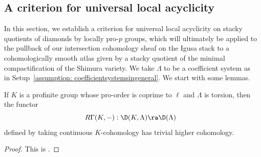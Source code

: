 \documentclass[letterpaper,11pt]{amsart}
\begin{document}
\subsection{A criterion for universal local acyclicity}
In this section, we establish a criterion for universal local acyclicity on stacky quotients of diamonds by locally pro-$p$ groups, which will ultimately be applied to the pullback of our intersection cohomology sheaf on the Igusa stack to a cohomologically smooth atlas given by a stacky quotient of the minimal compactification of the Shimura variety. We take $\Lambda$ to be a coefficient system as in Setup~\ref{assumption: coefficientsystemsingeneral}. We start with some lemmas. 
\begin{lemma}{\label{lemma: basicCohomologylemma}}
If $K$ is a profinite group whose pro-order is coprime to $\ell$ and $\Lambda$ is torsion, then the functor
\[ R\Gamma(K,-): \D(K,\Lambda) \ra \D(\Lambda) \]
defined by taking continuous $K$-cohomology has trivial higher cohomology.
\end{lemma}
\begin{proof}
    This is \cite[Corollary~III.3.3.7]{CohomologyofNumberFields}.
\end{proof}
\end{document}
